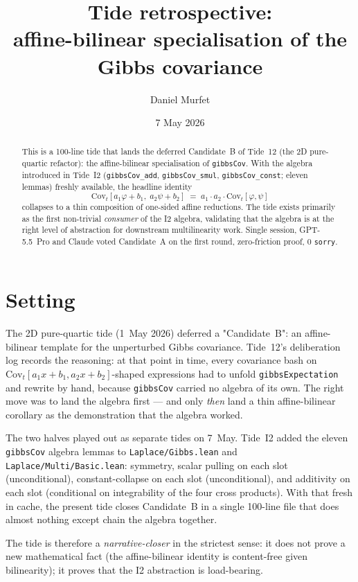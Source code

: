 \documentclass[11pt]{article}
\title{Tide retrospective:\\affine-bilinear specialisation of the Gibbs covariance}
\author{Daniel Murfet}
\date{7 May 2026}
\begin{document}
\maketitle

\begin{abstract}
This is a 100-line tide that lands the deferred Candidate~B of Tide~12
(the 2D pure-quartic refactor): the affine-bilinear specialisation of
\texttt{gibbsCov}. With the algebra introduced in Tide~I2 (\texttt{gibbsCov\_add}, \texttt{gibbsCov\_smul},
\texttt{gibbsCov\_const}; eleven lemmas) freshly available, the headline
identity
\[
  \mathrm{Cov}_t[a_1\varphi + b_1,\; a_2\psi + b_2]
  \;=\; a_1 \cdot a_2 \cdot \mathrm{Cov}_t[\varphi, \psi]
\]
collapses to a thin composition of one-sided affine reductions. The tide
exists primarily as the first non-trivial \emph{consumer} of the I2
algebra, validating that the algebra is at the right level of abstraction
for downstream multilinearity work. Single session, GPT-5.5~Pro and
Claude voted Candidate~A on the first round, zero-friction proof, 0
\texttt{sorry}.
\end{abstract}

\section{Setting}

The 2D pure-quartic tide (1~May 2026) deferred a "Candidate~B": an
affine-bilinear template for the unperturbed Gibbs covariance. Tide~12's
deliberation log records the reasoning: at that point in time, every
covariance bash on $\mathrm{Cov}_t[a_1 x + b_1, a_2 x + b_2]$-shaped
expressions had to unfold \texttt{gibbsExpectation} and rewrite by hand,
because \texttt{gibbsCov} carried no algebra of its own. The right move
was to land the algebra first --- and only \emph{then} land a thin
affine-bilinear corollary as the demonstration that the algebra worked.

The two halves played out as separate tides on 7~May. Tide~I2 added the
eleven \texttt{gibbsCov} algebra lemmas to \texttt{Laplace/Gibbs.lean}
and \texttt{Laplace/Multi/Basic.lean}: symmetry, scalar pulling on each
slot (unconditional), constant-collapse on each slot (unconditional), and
additivity on each slot (conditional on integrability of the four cross
products). With that fresh in cache, the present tide closes Candidate~B
in a single 100-line file that does almost nothing except chain the
algebra together.

The tide is therefore a \emph{narrative-closer} in the strictest sense:
it does not prove a new mathematical fact (the affine-bilinear identity
is content-free given bilinearity); it proves that the I2 abstraction is
load-bearing.
\end{document}
